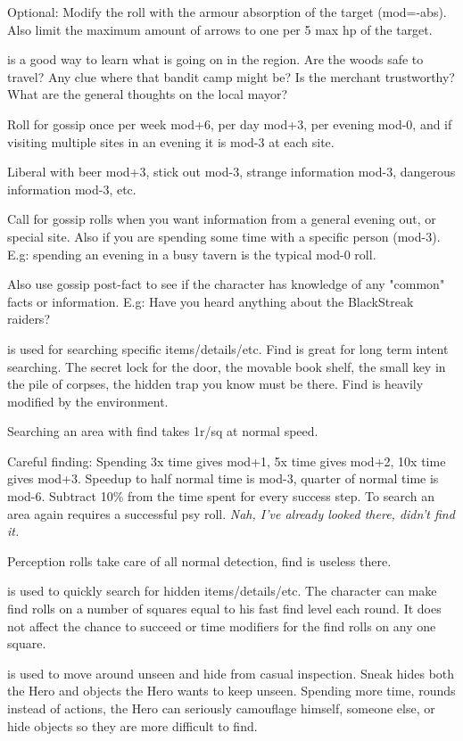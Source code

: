 Optional: Modify the roll with the armour absorption of the target (mod=-abs). Also limit the maximum amount of arrows to one per 5 max hp of the target.


 is a good way to learn what is going on in the region. Are the woods safe to travel? Any clue where that bandit camp might be? Is the merchant trustworthy? What are the general thoughts on the local mayor?

Roll for gossip once per week mod+6, per day mod+3, per evening mod-0, and if visiting multiple sites in an evening it is mod-3 at each site.

Liberal with beer mod+3, stick out mod-3, strange information mod-3, dangerous information mod-3, etc.

Call for gossip rolls when you want information from a general evening out, or special site. Also if you are spending some time with a specific person (mod-3). E.g: spending an evening in a busy tavern is the typical mod-0 roll.

Also use gossip post-fact to see if the character has knowledge of any "common" facts or information. E.g: Have you heard anything about the BlackStreak raiders?


 is used for searching specific items/details/etc. Find is great for long term intent searching. The secret lock for the door, the movable book shelf, the small key in the pile of corpses, the hidden trap you know must be there. Find is heavily modified by the environment.

Searching an area with find takes 1r/sq at normal speed.

Careful finding: Spending 3x time gives mod+1, 5x time gives mod+2, 10x time gives mod+3. Speedup to half normal time is mod-3, quarter of normal time is mod-6. Subtract 10\% from the time spent for every success step. To search an area again requires a successful psy roll. \emph{Nah, I've already looked there, didn't find it.}

Perception rolls take care of all normal detection, find is useless there.


 is used to quickly search for hidden items/details/etc. The character can make find rolls on a number of squares equal to his fast find level each round. It does not affect the chance to succeed or time modifiers for the find rolls on any one square.


 is used to move around unseen and hide from casual inspection. Sneak hides both the Hero and objects the Hero wants to keep unseen. Spending more time, rounds instead of actions, the Hero can seriously camouflage himself, someone else, or hide objects so they are more difficult to find.

